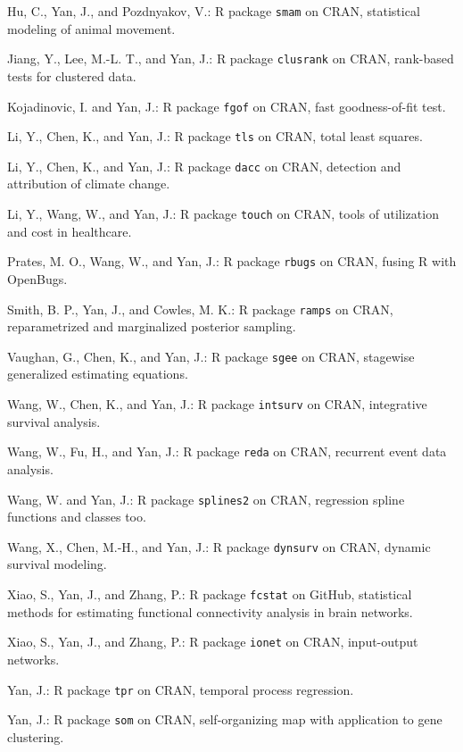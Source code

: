 \documentclass[Statistics]{vita}
\begin{document}
\begin{vita}
\begin{Publications}
\begin{Software}
  \item *Hu, C., Yan, J., and Pozdnyakov, V.: R package \texttt{smam} on CRAN, statistical modeling of animal movement. 
  \item *Jiang, Y., Lee, M.-L. T., and Yan, J.: R package \texttt{clusrank} on CRAN, rank-based tests for clustered data.
  \item Kojadinovic, I. and Yan, J.: R package \texttt{fgof} on CRAN, fast goodness-of-fit test.
  \item *Li, Y., Chen, K., and Yan, J.: R package \texttt{tls} on CRAN, total least squares.
  \item *Li, Y., Chen, K., and Yan, J.: R package \texttt{dacc} on CRAN, detection and attribution of climate change.
  \item *Li, Y., Wang, W., and Yan, J.: R package \texttt{touch} on CRAN, tools of utilization and cost in healthcare.
  \item *Prates, M. O., Wang, W., and Yan, J.: R package \texttt{rbugs} on CRAN, fusing R with OpenBugs.
  \item Smith, B. P., Yan, J., and Cowles, M. K.: R package \texttt{ramps} on CRAN, reparametrized and marginalized posterior sampling.
  \item *Vaughan, G., Chen, K., and Yan, J.: R package \texttt{sgee} on CRAN, stagewise generalized estimating equations.
  \item *Wang, W., Chen, K., and Yan, J.: R package \texttt{intsurv} on CRAN, integrative survival analysis.
  \item *Wang, W., Fu, H., and Yan, J.: R package \texttt{reda} on CRAN, recurrent event data analysis.
  \item *Wang, W. and Yan, J.: R package \texttt{splines2} on CRAN, regression spline functions and classes too.
  \item *Wang, X., Chen, M.-H., and Yan, J.: R package \texttt{dynsurv} on CRAN, dynamic survival modeling.
  \item *Xiao, S., Yan, J., and Zhang, P.: R package \texttt{fcstat} on GitHub, statistical methods for estimating functional connectivity analysis in brain networks.
  \item *Xiao, S., Yan, J., and Zhang, P.: R package \texttt{ionet} on CRAN, input-output networks.
  \item Yan, J.: R package \texttt{tpr} on CRAN, temporal process regression.
  \item Yan, J.: R package \texttt{som} on CRAN, self-organizing map with application to gene clustering.

\end{Software}
\end{Publications}
\end{vita}
\end{document}
